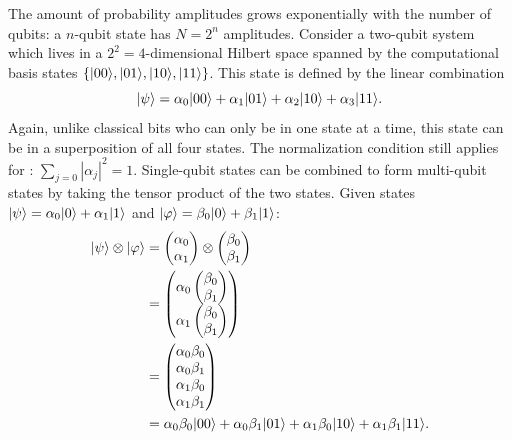 The amount of probability amplitudes grows exponentially with the number of qubits: a $n$-qubit state has $N = 2^n$ amplitudes.
Consider a two-qubit system which lives in a $2^2=4$-dimensional Hilbert space spanned by the computational basis states $\left\{\vert{00}\rangle, \vert{01}\rangle, \vert{10}\rangle, \vert{11}\rangle\right\}$.
This state is defined by the linear combination
\begin{equation} \label{eqn:two-qubit-state}
\vert{\psi}\rangle = \alpha_0\vert{00}\rangle + \alpha_1\vert{01}\rangle + \alpha_2\vert{10}\rangle + \alpha_3\vert{11}\rangle.
\end{equation}
Again, unlike classical bits who can only be in one state at a time, this state can be in a superposition of all four states.
The normalization condition still applies for : $\sum_{j=0}|\alpha_j|^2 = 1$.
Single-qubit states can be combined to form multi-qubit states by taking the tensor product of the two states.
Given states $\vert{\psi}\rangle = \alpha_0\vert{0}\rangle + \alpha_1\vert{1}\rangle$ and $\vert{\varphi}\rangle = \beta_0\vert{0}\rangle + \beta_1\vert{1}\rangle$:
\begin{equation} \label{eqn:tensor-product-states}
\begin{aligned}
\vert{\psi}\rangle \otimes \vert{\varphi}\rangle &= \begin{pmatrix}\alpha_0 \\ \alpha_1\end{pmatrix} \otimes \begin{pmatrix}\beta_0 \\ \beta_1\end{pmatrix} \\
&= \begin{pmatrix}\alpha_0\begin{pmatrix}\beta_0 \\ \beta_1\end{pmatrix} \\ \alpha_1\begin{pmatrix}\beta_0 \\ \beta_1\end{pmatrix}\end{pmatrix} \\
&= \begin{pmatrix}\alpha_0\beta_0 \\ \alpha_0\beta_1 \\ \alpha_1\beta_0 \\ \alpha_1\beta_1\end{pmatrix} \\
&= \alpha_0\beta_0\vert{00}\rangle + \alpha_0\beta_1\vert{01}\rangle + \alpha_1\beta_0\vert{10}\rangle + \alpha_1\beta_1\vert{11}\rangle.
\end{aligned}
\end{equation}
